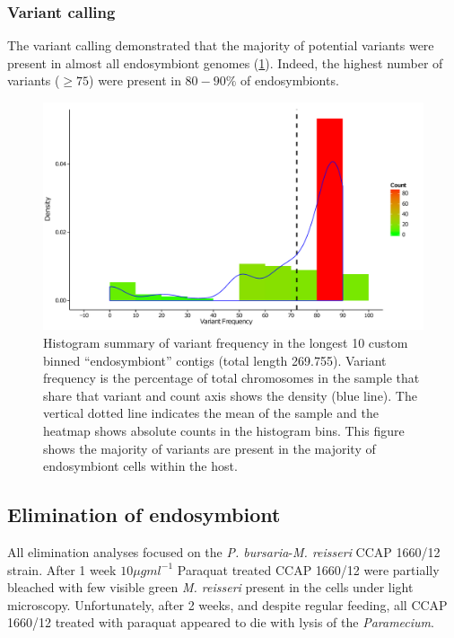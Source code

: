\subsubsection{Variant calling}

The variant calling demonstrated that the majority of potential
variants were present in almost all endosymbiont genomes (\cref{fig:var_contig}).
Indeed, the highest number of variants (\(\geq 75\)) were present in 
\(80-90\%\) of endosymbionts.

\begin{figure}
    \centering
    \includegraphics[width=\textwidth]{snp_variant_longest_contig.pdf}
    \caption[Endosymbiont variant count and frequency density]{
        Histogram summary of variant frequency in the longest 
        10 custom binned ``endosymbiont'' contigs (total length \SI{269,755}{\bp}).
        Variant frequency is the percentage of total chromosomes
        in the sample that share that variant and count axis shows
        the density (blue line).  The vertical dotted line indicates
        the mean of the sample and the heatmap shows absolute counts
        in the histogram bins. This figure shows the majority
        of variants are present in the majority of endosymbiont
    cells within the host.}
    \label{fig:var_contig}
\end{figure}

\subsection{Elimination of endosymbiont}

All elimination analyses focused on the \textit{P. bursaria}-\textit{M. reisseri}
CCAP 1660/12 strain.
After 1 week \(10\mu g ml^{-1}\) Paraquat treated CCAP 1660/12 were partially bleached
with few visible green \textit{M. reisseri} present in the cells under light
microscopy.
Unfortunately, after 2 weeks, and despite regular feeding, all CCAP 1660/12
treated with paraquat appeared to die with lysis of the \textit{Paramecium}.

